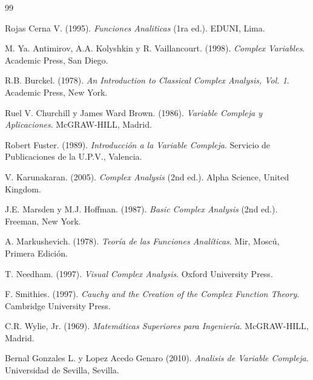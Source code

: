\documentclass[a4paper,12pt]{article}
\begin{document}
\begin{thebibliography}{99}

Rojas Cerna V. (1995). \textit{Funciones Analiticas} (1ra ed.). EDUNI, Lima.

M. Ya. Antimirov, A.A. Kolyshkin y R. Vaillancourt. (1998). \textit{Complex Variables}. Academic Press, San Diego.

R.B. Burckel. (1978). \textit{An Introduction to Classical Complex Analysis, Vol. 1}. Academic Press, New York.

Ruel V. Churchill y James Ward Brown. (1986). \textit{Variable Compleja y Aplicaciones}. McGRAW-HILL, Madrid.

Robert Fuster. (1989). \textit{Introducción a la Variable Compleja}. Servicio de Publicaciones de la U.P.V., Valencia.

V. Karunakaran. (2005). \textit{Complex Analysis} (2nd ed.). Alpha Science, United Kingdom.

J.E. Marsden y M.J. Hoffman. (1987). \textit{Basic Complex Analysis} (2nd ed.). Freeman, New York.

A. Markushevich. (1978). \textit{Teoría de las Funciones Analíticas}. Mir, Moscú, Primera Edición.

T. Needham. (1997). \textit{Visual Complex Analysis}. Oxford University Press.

F. Smithies. (1997). \textit{Cauchy and the Creation of the Complex Function Theory}. Cambridge University Press.

C.R. Wylie, Jr. (1969). \textit{Matemáticas Superiores para Ingeniería}. McGRAW-HILL, Madrid.

Bernal Gonzales L. y Lopez Acedo Genaro (2010). \textit{Analisis de Variable Compleja}. Universidad de Sevilla, Sevilla.


\end{thebibliography}
\end{document}
